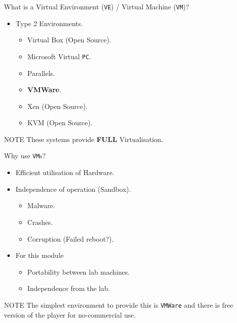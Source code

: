 \documentclass{beamer}
\begin{document}
\begin{frame}{What is a Virtual Environment (\texttt{VE}) / Virtual Machine (\texttt{VM})?}
  \begin{itemize}
    \item Type 2 Environments.
      \begin{itemize}
        \item Virtual Box (Open Source).
        \item Microsoft Virtual \texttt{PC}.
        \item Parallels.
        \item \textbf{VMWare}.
        \item Xen (Open Source).
        \item KVM (Open Source).
      \end{itemize}  
  \end{itemize}
  \begin{block}{NOTE}
    These systems provide \textbf{FULL} Virtualisation.
  \end{block}
\end{frame}

\begin{frame}{Why use \texttt{VM}s?}
  \begin{itemize}
    \item Efficient utilisation of Hardware.
    \item Independence of operation (Sandbox).
      \begin{itemize}
        \item Malware.
        \item Crashes.
        \item Corruption (Failed reboot?).
      \end{itemize}  
    \item For this module
      \begin{itemize}
        \item Portability between lab machines.
        \item Independence from the lab.
      \end{itemize}  
  \end{itemize}  
  \begin{block}{NOTE}
    The simplest environment to provide this is \texttt{VMWare} and there is free version of the player for no-commercial use.
  \end{block}
\end{frame}
\end{document}
